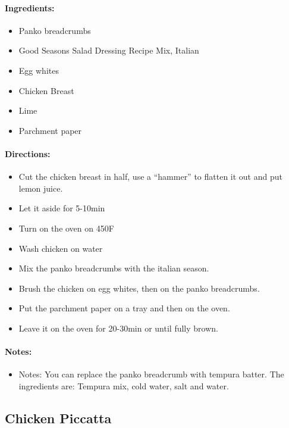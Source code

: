\documentclass{article}
\begin{document}
\paragraph{Ingredients:}
\begin{itemize}
    \item Panko breadcrumbs
    \item Good Seasons Salad Dressing Recipe Mix, Italian
    \item Egg whites
    \item Chicken Breast
    \item Lime
    \item Parchment paper
\end{itemize}

\paragraph{Directions:}
\begin{itemize}
    \item Cut the chicken breast in half, use a “hammer” to flatten it out and put lemon juice.
    \item Let it aside for 5-10min
    \item Turn on the oven on 450F
    \item Wash chicken on water
    \item Mix the panko breadcrumbs with the italian season.
    \item Brush the chicken on egg whites, then on the panko breadcrumbs.
    \item Put the parchment paper on a tray and then on the oven.
    \item Leave it on the oven for 20-30min or until fully brown.
\end{itemize}

\paragraph{Notes:}
\begin{itemize}
    \item Notes: You can replace the panko breadcrumb with tempura batter. The ingredients are: Tempura mix, cold water, salt and water.
\end{itemize}

\subsection{Chicken Piccatta} 
\end{document}
